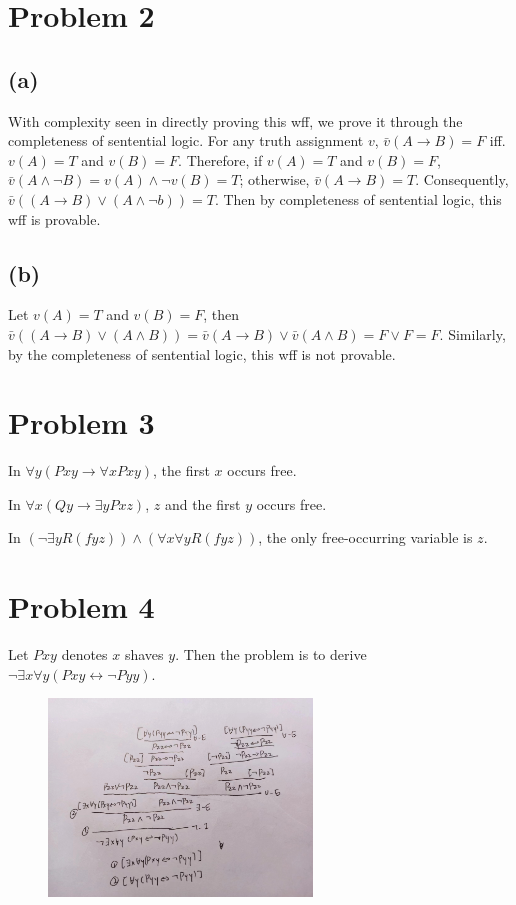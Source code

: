 \documentclass{article}
\begin{document}
\section*{Problem 2}

\subsection*{(a)}

	With complexity seen in directly proving this wff, we prove it through the completeness of sentential logic. For any truth assignment $v$, $\bar{v}(A\to B)=F$ iff. $v(A)=T$ and $v(B)=F$. Therefore, if $v(A)=T$ and $v(B)=F$, $\bar{v}(A\land \neg B)=v(A) \land \neg v(B)=T$; otherwise, $\bar{v}(A\to B)=T$. Consequently, $\bar{v}((A\to B)\lor (A\land \neg b))=T$. Then by completeness of sentential logic, this wff is provable.
	
\subsection*{(b)}

	Let $v(A)=T$ and $v(B)=F$, then $\bar{v}((A\to B)\lor (A \land B))=\bar{v}(A\to B) \lor \bar{v}(A\land B)= F \lor F = F$. Similarly, by the completeness of sentential logic, this wff is not provable.
	
	

\section*{Problem 3}

	In $\forall y (Pxy \to \forall x Pxy)$, the first $x$ occurs free.
	
	In $\forall x (Q y \to \exists y Pxz)$, $z$ and the first $y$ occurs free.
	
	In $(\neg \exists y R(fyz)) \land (\forall x \forall y R(fyz))$, the only free-occurring variable is $z$.




\section*{Problem 4}

	Let $Pxy$ denotes $x$ shaves $y$. Then the problem is to derive $\neg \exists x \forall y (Pxy \leftrightarrow \neg Pyy)$.
\begin{figure}[htbp]
	\centering
	\includegraphics[width=7cm]{prob4.jpg}
\end{figure}
\end{document}
